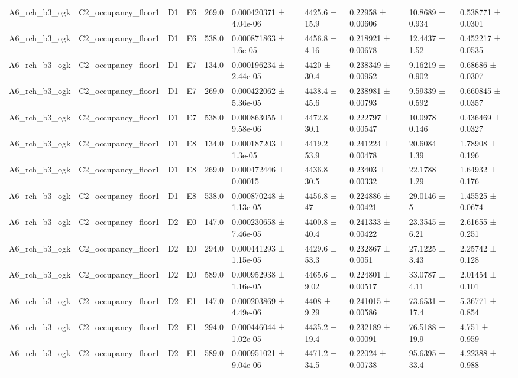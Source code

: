 \begin{table}
\begin{tabular}{llllllllll}
A6\_rch\_b3\_ogk & C2\_occupancy\_floor1 & D1 & E6 & 269.0 & 0.000420371 ± 4.04e-06 & 4425.6 ± 15.9 & 0.22958 ± 0.00606 & 10.8689 ± 0.934 & 0.538771 ± 0.0301 \\
A6\_rch\_b3\_ogk & C2\_occupancy\_floor1 & D1 & E6 & 538.0 & 0.000871863 ± 1.6e-05 & 4456.8 ± 4.16 & 0.218921 ± 0.00678 & 12.4437 ± 1.52 & 0.452217 ± 0.0535 \\
A6\_rch\_b3\_ogk & C2\_occupancy\_floor1 & D1 & E7 & 134.0 & 0.000196234 ± 2.44e-05 & 4420 ± 30.4 & 0.238349 ± 0.00952 & 9.16219 ± 0.902 & 0.68686 ± 0.0307 \\
A6\_rch\_b3\_ogk & C2\_occupancy\_floor1 & D1 & E7 & 269.0 & 0.000422062 ± 5.36e-05 & 4438.4 ± 45.6 & 0.238981 ± 0.00793 & 9.59339 ± 0.592 & 0.660845 ± 0.0357 \\
A6\_rch\_b3\_ogk & C2\_occupancy\_floor1 & D1 & E7 & 538.0 & 0.000863055 ± 9.58e-06 & 4472.8 ± 30.1 & 0.222797 ± 0.00547 & 10.0978 ± 0.146 & 0.436469 ± 0.0327 \\
A6\_rch\_b3\_ogk & C2\_occupancy\_floor1 & D1 & E8 & 134.0 & 0.000187203 ± 1.3e-05 & 4419.2 ± 53.9 & 0.241224 ± 0.00478 & 20.6084 ± 1.39 & 1.78908 ± 0.196 \\
A6\_rch\_b3\_ogk & C2\_occupancy\_floor1 & D1 & E8 & 269.0 & 0.000472446 ± 0.00015 & 4436.8 ± 30.5 & 0.23403 ± 0.00332 & 22.1788 ± 1.29 & 1.64932 ± 0.176 \\
A6\_rch\_b3\_ogk & C2\_occupancy\_floor1 & D1 & E8 & 538.0 & 0.000870248 ± 1.13e-05 & 4456.8 ± 47 & 0.224886 ± 0.00421 & 29.0146 ± 5 & 1.45525 ± 0.0674 \\
A6\_rch\_b3\_ogk & C2\_occupancy\_floor1 & D2 & E0 & 147.0 & 0.000230658 ± 7.46e-05 & 4400.8 ± 40.4 & 0.241333 ± 0.00422 & 23.3545 ± 6.21 & 2.61655 ± 0.251 \\
A6\_rch\_b3\_ogk & C2\_occupancy\_floor1 & D2 & E0 & 294.0 & 0.000441293 ± 1.15e-05 & 4429.6 ± 53.3 & 0.232867 ± 0.0051 & 27.1225 ± 3.43 & 2.25742 ± 0.128 \\
A6\_rch\_b3\_ogk & C2\_occupancy\_floor1 & D2 & E0 & 589.0 & 0.000952938 ± 1.16e-05 & 4465.6 ± 9.02 & 0.224801 ± 0.00517 & 33.0787 ± 4.11 & 2.01454 ± 0.101 \\
A6\_rch\_b3\_ogk & C2\_occupancy\_floor1 & D2 & E1 & 147.0 & 0.000203869 ± 4.49e-06 & 4408 ± 9.29 & 0.241015 ± 0.00586 & 73.6531 ± 17.4 & 5.36771 ± 0.854 \\
A6\_rch\_b3\_ogk & C2\_occupancy\_floor1 & D2 & E1 & 294.0 & 0.000446044 ± 1.02e-05 & 4435.2 ± 19.4 & 0.232189 ± 0.00091 & 76.5188 ± 19.9 & 4.751 ± 0.959 \\
A6\_rch\_b3\_ogk & C2\_occupancy\_floor1 & D2 & E1 & 589.0 & 0.000951021 ± 9.04e-06 & 4471.2 ± 34.5 & 0.22024 ± 0.00738 & 95.6395 ± 33.4 & 4.22388 ± 0.988 \\

\end{tabular}
\end{table}

